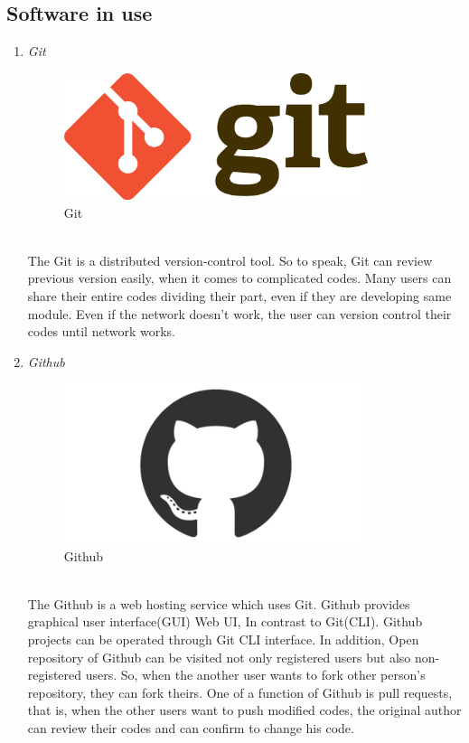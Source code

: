 \documentclass[conference]{IEEEtran}
\begin{document}
\subsection{Software in use}
\begin{enumerate} 
  \item \textit{Git } 
    \begin{figure}[htbp]
    \centerline{\includegraphics[width=89mm, scale=0.5]{fig/git.png}}
    \caption{Git}
    \label{fig}
    \end{figure}
  \\The Git is a distributed version-control tool. So to speak, Git can review previous version easily, when it comes to complicated codes. Many users can share their entire codes dividing their part, even if they are developing same module. Even if the network doesn’t work, the user can version control their codes until network works.\\
   \item \textit{Github} 
       \begin{figure}[htbp]
    \centerline{\includegraphics[width=89mm, scale=0.5]{fig/github.png}}
    \caption{Github}
    \label{fig}
    \end{figure}
   \\The Github is a web hosting service which uses Git. Github provides graphical user interface(GUI) Web UI, In contrast to Git(CLI). Github projects can be operated through Git CLI interface. In addition, Open repository of Github can be visited not only registered users but also non-registered users. So, when the another user wants to fork other person’s repository, they can fork theirs. One of a function of Github is pull requests, that is, when the other users want to push modified codes, the original author can review their codes and can confirm to change his code. \\

\end{enumerate}
\end{document}
